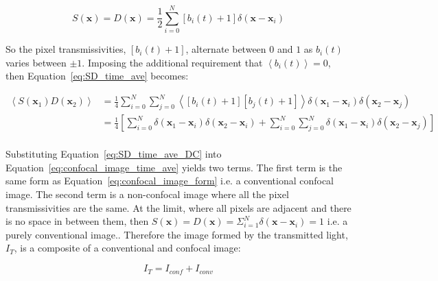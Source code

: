 \begin{equation}\label{eq:detector_aperture_time_DC}
S\left(\textbf{x}\right) = D\left(\textbf{x}\right) = \frac{1}{2} \sum_{i=0}^{N} \left[b_{i}\left(t\right) + 1\right]\delta\left(\textbf{x} - \textbf{x}_{i}\right)
\end{equation} 

So the pixel transmissivities, $\left[b_{i}\left(t\right) + 
1\right]$, alternate between $0$ and $1$ as $b_{i}\left(t\right)$ 
varies between $\pm1$. Imposing the additional requirement that 
$\left\langle b_{i}\left(t\right) \right\rangle = 0$, then 
Equation~\ref{eq:SD_time_ave} becomes:

\begin{equation}\label{eq:SD_time_ave_DC}
\begin{split}
\left\langle S\left(\textbf{x}_{1}\right) D\left(\textbf{x}_{2}\right)\right\rangle &= \frac{1}{4} \sum_{i=0}^{N}\sum_{j=0}^{N} \left\langle \left[b_{i}\left(t\right) + 1\right] \left[b_{j}\left(t\right) + 1\right] \right\rangle \delta\left(\textbf{x}_{1} - \textbf{x}_{i}\right) \delta\left(\textbf{x}_{2} - \textbf{x}_{j}\right)\\
&= \frac{1}{4} \left[\sum_{i=0}^{N} \delta\left(\textbf{x}_{1} - \textbf{x}_{i}\right) \delta\left(\textbf{x}_{2} - \textbf{x}_{i}\right) + \sum_{i=0}^{N}\sum_{j=0}^{N} \delta\left(\textbf{x}_{1} - \textbf{x}_{i}\right) \delta\left(\textbf{x}_{2} - \textbf{x}_{j}\right)\right]\\
\end{split}
\end{equation}

Substituting Equation~\ref{eq:SD_time_ave_DC} into Equation~\ref{eq:confocal_image_time_ave} 
yields two terms. The first term is the same form as 
Equation~\ref{eq:confocal_image_form} i.e. a conventional 
confocal image. The second term is a non-confocal image 
where all the pixel transmissivities are the same. At the 
limit, where all pixels are adjacent and there is no space 
in between them, then $S\left(\textbf{x}\right) = 
D\left(\textbf{x}\right) = \Sigma_{i=1}^{N}\delta\left(
\textbf{x} - \textbf{x}_{i}\right) = 1$ i.e. a purely 
conventional image.\cite{juskaitis1996efficient,wilson1996confocal}. 
Therefore the image formed by the transmitted light, $I_{T}$, 
is a composite of a conventional and confocal image:

\begin{equation}\label{eq:transmitted_image}
I_{T} = I_{conf} + I_{conv}
\end{equation}

